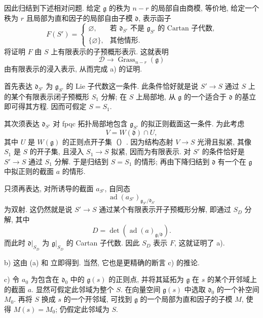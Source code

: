 因此归结到下述相对问题. 给定 \(\mathfrak g\) 的秩为 \(n-r\) 的局部自由商模, 等价地, 给定一个秩为 \(r\) 且局部为直和因子的局部自由子模 \(\mathfrak d\), 表示函子
\[
 F(S')=
 \begin{cases}
   \varnothing,
     &\text{若 \(\mathfrak d_{S'}\) 不是 \(\mathfrak g_{S'}\) 的 Cartan 子代数,}\\
   \{\varnothing\},
     &\text{其他情形.}
 \end{cases}
\]
将证明 \(F\) 由 \(S\) 上有限表示的子预概形表示. 这就表明
\[
  \mathcal D\longrightarrow
  \operatorname{Grass}_{n-r}(\mathfrak g)
\]
由有限表示的浸入表示, 从而完成 a) 的证明.

首先表达 \(\mathfrak d_{S'}\) 为 \(\mathfrak g_{S'}\) 的 Lie 子代数这一条件. 此条件恰好就是说 \(S'\to S\) 通过 \(S\) 上的某个有限表示闭子预概形 \(S_1\) 分解; 在 \(S\) 上局部地, 从 \(\mathfrak g\) 的一个适合于 \(\mathfrak d\) 的基立即可得其方程. 因而可假定 \(S=S_1\).

其次须表达 \(\mathfrak d_{S'}\) 对 fpqc 拓扑局部地包含 \(\mathfrak g_{S'}\) 的拟正则截面这一条件. 为此考虑
\[
  V=W(\mathfrak d)\cap U,
\]
其中 \(U\) 是 \(W(\mathfrak g)\) 的正则点开子集\textup{（）}. 因为结构态射 \(V\to S\) 光滑且拟紧, 其像 \(S_1\) 是 \(S\) 的开子集, 且浸入 \(S_1\to S\) 拟紧, 因而为有限表示. 对 \(S'\) 的条件恰好是 \(S'\to S\) 通过 \(S_1\) 分解. 于是归结到 \(S=S_1\) 的情形; 再由下降归结到 \(\mathfrak d\) 有一个在 \(\mathfrak g\) 中拟正则的截面 \(a\) 的情形.

只须再表达, 对所诱导的截面 \(a_{S'}\), 自同态
\[
  \operatorname{ad}(a_{S'})
    _{\mathfrak g_{S'}/\mathfrak d_{S'}}
\]
为双射. 这仍然就是说 \(S'\to S\) 通过某个有限表示开子预概形分解, 即通过 \(S_D\) 分解, 其中
\[
  D=\det\!\left(
    \operatorname{ad}(a)_{\mathfrak g/\mathfrak d}
  \right).
\]
而此时 \(\mathfrak d|_{S_D}\) 为 \(\mathfrak g|_{S_D}\) 的 Cartan 子代数. 因此 \(S_D\) 表示 \(F\), 这就证明了 a).

\medskip
\noindent\textup{b)}
这由 \textup{(a)} 和  立即得到. 当然, 它也是更精确的断言 c) 的推论.

\medskip
\noindent\textup{c)}
令 \(a_0\) 为包含在 \(\mathfrak d_0\) 中的 \(\mathfrak g(s)\) 的正则点, 并将其延拓为 \(\mathfrak g\) 在 \(s\) 的某个开邻域上的截面 \(a\). 显然可假定此邻域为整个 \(S\). 在向量空间 \(\mathfrak g(s)\) 中选取 \(\mathfrak d_0\) 的一个补空间 \(M_0\). 再将 \(S\) 换成 \(s\) 的一个开邻域, 可找到 \(\mathfrak g\) 的一个局部为直和因子的子模 \(M\), 使得 \(M(s)=M_0\); 仍假定此邻域为 \(S\).

